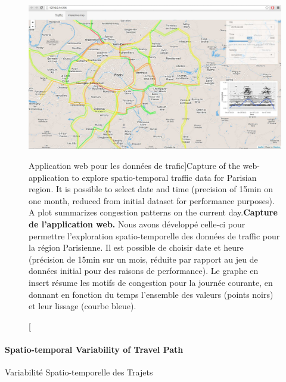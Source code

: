 \begin{figure}
\includegraphics[width=\linewidth]{Figures/Final/8-1-2-fig-transportationequilibrium-fig-1.jpg}
\caption[Web-application for traffic data][Application web pour les données de trafic]{Capture of the web-application to explore spatio-temporal traffic data for Parisian region. It is possible to select date and time (precision of 15min on one month, reduced from initial dataset for performance purposes). A plot summarizes congestion patterns on the current day.\label{fig:transportationequilibrium:fig-1}}{\textbf{Capture de l'application web.} Nous avons développé celle-ci pour permettre l'exploration spatio-temporelle des données de traffic pour la région Parisienne. Il est possible de choisir date et heure (précision de 15min sur un mois, réduite par rapport au jeu de données initial pour des raisons de performance). Le graphe en insert résume les motifs de congestion pour la journée courante, en donnant en fonction du temps l'ensemble des valeurs (points noirs) et leur lissage (courbe bleue).\label{fig:transportationequilibrium:fig-1}}
\end{figure}



\paragraph{Spatio-temporal Variability of Travel Path}{Variabilité Spatio-temporelle des Trajets}



